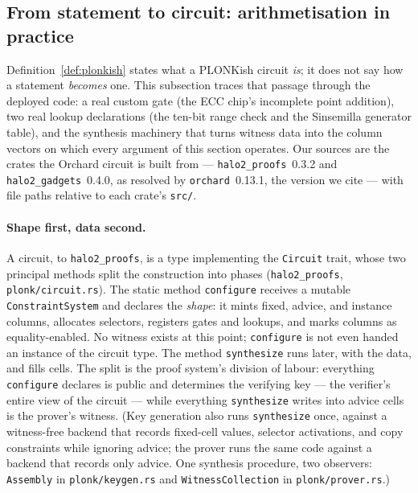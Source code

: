 \documentclass[11pt,a4paper]{article}
\theoremstyle{definition}
\begin{document}
\subsection{From statement to circuit: arithmetisation in practice}
\label{sec:statement-to-circuit}

Definition~\ref{def:plonkish} states what a PLONKish circuit \emph{is}; it
does not say how a statement \emph{becomes} one. This subsection traces that
passage through the deployed code: a real custom gate (the ECC chip's
incomplete point addition), two real lookup declarations (the ten-bit range
check and the Sinsemilla generator table), and the synthesis machinery that
turns witness data into the column vectors on which every argument of this
section operates. Our sources are the crates the Orchard circuit is built
from --- \texttt{halo2\_proofs}~0.3.2 and \texttt{halo2\_gadgets}~0.4.0, as
resolved by \texttt{orchard}~0.13.1, the version we cite --- with file
paths relative to each crate's \texttt{src/}.

\paragraph{Shape first, data second.}
A circuit, to \texttt{halo2\_proofs}, is a type implementing the
\texttt{Circuit} trait, whose two principal methods split the construction
into phases (\texttt{halo2\_proofs}, \texttt{plonk/circuit.rs}). The static
method \texttt{configure} receives a mutable \texttt{ConstraintSystem} and
declares the \emph{shape}: it mints fixed, advice, and instance columns,
allocates selectors, registers gates and lookups, and marks columns as
equality-enabled. No witness exists at this point; \texttt{configure} is not
even handed an instance of the circuit type. The method \texttt{synthesize}
runs later, with the data, and fills cells. The split is the proof system's
division of labour: everything \texttt{configure} declares is public and
determines the verifying key --- the verifier's entire view of the circuit
--- while everything \texttt{synthesize} writes into advice cells is the
prover's witness. (Key generation also runs \texttt{synthesize} once,
against a witness-free backend that records fixed-cell values, selector
activations, and copy constraints while ignoring advice; the prover runs the
same code against a backend that records only advice. One synthesis
procedure, two observers: \texttt{Assembly} in \texttt{plonk/keygen.rs} and
\texttt{WitnessCollection} in \texttt{plonk/prover.rs}.)
\end{document}
